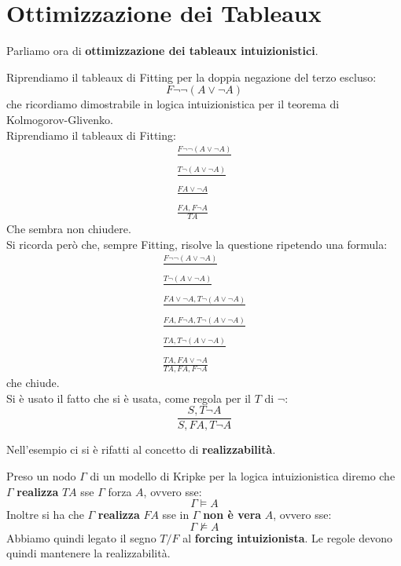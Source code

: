 \documentclass[a4paper,12pt, oneside]{book}
\begin{document}
\section{Ottimizzazione dei Tableaux}
Parliamo ora di \textbf{ottimizzazione dei tableaux intuizionistici}.\\
\begin{esempio}
  Riprendiamo il tableaux di Fitting per la doppia negazione del terzo escluso:
  \[F\neg \neg (A\lor \neg A)\]
  che ricordiamo dimostrabile in logica intuizionistica per il teorema di
  Kolmogorov-Glivenko. \\
  Riprendiamo il tableaux di Fitting:
  \begin{gather*}
    \frac{F\neg \neg (A\lor \neg A)}{}\\
    \frac{T\neg(A\lor \neg A)}{}\\
    \frac{FA\lor \neg A}{}\\
    \frac{FA,F\neg A}{TA}
  \end{gather*}
  Che sembra non chiudere. \\
  Si ricorda però che, sempre Fitting, risolve la questione ripetendo una
  formula: 
  \begin{gather*}
    \frac{F\neg \neg (A\lor \neg A)}{}\\
    \frac{T\neg(A\lor \neg A)}{}\\
    \frac{FA\lor \neg A, T\neg(A\lor \neg A)}{}\\
    \frac{FA,F\neg A,T\neg(A\lor \neg A)}{}\\
    \frac{TA,T\neg(A\lor \neg A)}{}\\
    \frac{TA, FA\lor \neg A}{TA, FA, F\neg A}
  \end{gather*}
  che chiude.\\
  Si è usato il fatto che si è usata, come regola per il $T$ di $\neg$:
  \[\frac{S, T\neg A}{S, FA, T\neg A}\]
\end{esempio}
Nell'esempio ci si è rifatti al concetto di \textbf{realizzabilità}.
\begin{definizione}
  Preso un nodo $\Gamma$ di un modello di Kripke per la logica intuizionistica
  diremo che $\Gamma$ \textbf{realizza} $TA$ sse $\Gamma$ \textup{forza} $A$,
  ovvero sse: 
  \[\Gamma\vDash A\]
  Inoltre si ha che $\Gamma$ \textbf{realizza} $FA$ sse in $\Gamma$ \textbf{non
    è vera} $A$, ovvero sse:
  \[\Gamma\nvDash A\]
  Abbiamo quindi legato il segno $T/F$ al \textbf{forcing intuizionista}. Le
  regole devono quindi mantenere la realizzabilità.
\end{definizione}
\end{document}
